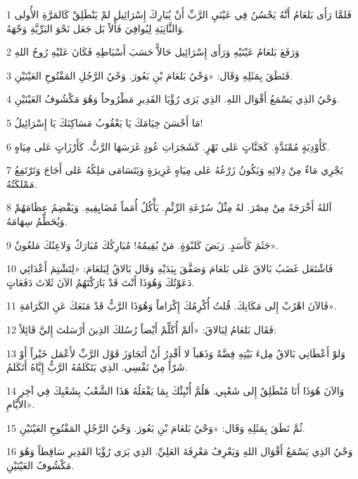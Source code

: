 \par 1 فَلمَّا رَأَى بَلعَامُ أَنَّهُ يَحْسُنُ فِي عَيْنَيِ الرَّبِّ أَنْ يُبَارِكَ إِسْرَائِيل لمْ يَنْطَلِقْ كَالمَرَّةِ الأُولى وَالثَّانِيَةِ لِيُوافِيَ فَأْلاً بَل جَعَل نَحْوَ البَرِّيَّةِ وَجْهَهُ.
\par 2 وَرَفَعَ بَلعَامُ عَيْنَيْهِ وَرَأَى إِسْرَائِيل حَالاًّ حَسَبَ أَسْبَاطِهِ فَكَانَ عَليْهِ رُوحُ اللهِ
\par 3 فَنَطَقَ بِمَثَلِهِ وَقَال: «وَحْيُ بَلعَامَ بْنِ بَعُورَ. وَحْيُ الرَّجُلِ المَفْتُوحِ العَيْنَيْنِ.
\par 4 وَحْيُ الذِي يَسْمَعُ أَقْوَال اللهِ. الذِي يَرَى رُؤْيَا القَدِيرِ مَطْرُوحاً وَهُوَ مَكْشُوفُ العَيْنَيْنِ.
\par 5 مَا أَحْسَنَ خِيَامَكَ يَا يَعْقُوبُ مَسَاكِنَكَ يَا إِسْرَائِيلُ!
\par 6 كَأَوْدِيَةٍ مُمْتَدَّةٍ. كَجَنَّاتٍ عَلى نَهْرٍ. كَشَجَرَاتِ عُودٍ غَرَسَهَا الرَّبُّ. كَأَرْزَاتٍ عَلى مِيَاهٍ.
\par 7 يَجْرِي مَاءٌ مِنْ دِلائِهِ وَيَكُونُ زَرْعُهُ عَلى مِيَاهٍ غَزِيرَةٍ وَيَتَسَامَى مَلِكُهُ عَلى أَجَاجَ وَتَرْتَفِعُ مَمْلكَتُهُ.
\par 8 اَللهُ أَخْرَجَهُ مِنْ مِصْرَ. لهُ مِثْلُ سُرْعَةِ الرِّئْمِ. يَأْكُلُ أُمَماً مُضَايِقِيهِ. وَيَقْضِمُ عِظَامَهُمْ وَيُحَطِّمُ سِهَامَهُ.
\par 9 جَثَمَ كَأَسَدٍ. رَبَضَ كَلبْوَةٍ. مَنْ يُقِيمُهُ! مُبَارِكُكَ مُبَارَكٌ وَلاعِنُكَ مَلعُونٌ».
\par 10 فَاشْتَعَل غَضَبُ بَالاقَ عَلى بَلعَامَ وَصَفَّقَ بِيَدَيْهِ وَقَال بَالاقُ لِبَلعَامَ: «لِتَشْتِمَ أَعْدَائِي دَعَوْتُكَ وَهُوَذَا أَنْتَ قَدْ بَارَكْتَهُمُ الآنَ ثَلاثَ دَفَعَاتٍ.
\par 11 فَالآنَ اهْرُبْ إِلى مَكَانِكَ. قُلتُ أُكْرِمُكَ إِكْرَاماً وَهُوَذَا الرَّبُّ قَدْ مَنَعَكَ عَنِ الكَرَامَةِ».
\par 12 فَقَال بَلعَامُ لِبَالاقَ: «أَلمْ أُكَلِّمْ أَيْضاً رُسُلكَ الذِينَ أَرْسَلتَ إِليَّ قَائِلاً:
\par 13 وَلوْ أَعْطَانِي بَالاقُ مِلءَ بَيْتِهِ فِضَّةً وَذَهَباً لا أَقْدِرُ أَنْ أَتَجَاوَزَ قَوْل الرَّبِّ لأَعْمَل خَيْراً أَوْ شَرّاً مِنْ نَفْسِي. الذِي يَتَكَلمُهُ الرَّبُّ إِيَّاهُ أَتَكَلمُ.
\par 14 وَالآنَ هُوَذَا أَنَا مُنْطَلِقٌ إِلى شَعْبِي. هَلُمَّ أُنْبِئْكَ بِمَا يَفْعَلُهُ هَذَا الشَّعْبُ بِشَعْبِكَ فِي آخِرِ الأَيَّامِ».
\par 15 ثُمَّ نَطَقَ بِمَثَلِهِ وَقَال: «وَحْيُ بَلعَامَ بْنِ بَعُورَ. وَحْيُ الرَّجُلِ المَفْتُوحِ العَيْنَيْنِ.
\par 16 وَحْيُ الذِي يَسْمَعُ أَقْوَال اللهِ وَيَعْرِفُ مَعْرِفَةَ العَلِيِّ. الذِي يَرَى رُؤْيَا القَدِيرِ سَاقِطاً وَهُوَ مَكْشُوفُ العَيْنَيْنِ.
